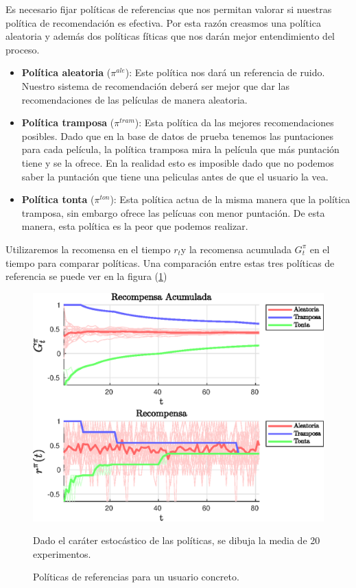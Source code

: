 Es necesario fijar políticas de referencias que nos permitan valorar si nuestras política de recomendación es efectiva. Por esta razón creasmos una política aleatoria y además dos políticas fíticas que nos darán mejor entendimiento del proceso. 
\begin{itemize}
    \item \textbf{Política aleatoria} ($\pi^{ale}$): Este política nos dará un referencia de ruido. Nuestro sistema de recomendación deberá ser mejor que dar las recomendaciones de las películas de manera aleatoria. 
    \item \textbf{Política tramposa} ($\pi^{tram}$): Esta política da las mejores recomendaciones posibles. Dado que en la base de datos de prueba tenemos las puntaciones para cada película, la política tramposa mira la película que más puntación tiene y se la ofrece. En la realidad esto es imposible dado que no podemos saber la puntación que tiene una peliculas antes de que el usuario la vea.
    \item \textbf{Política tonta} ($\pi^{ton}$): Esta política actua de la misma manera que la política tramposa, sin embargo ofrece las pelícuas con menor puntación. De esta manera, esta política es la peor que podemos realizar.

\end{itemize}

Utilizaremos la recomensa en el tiempo $r_t$y la recomensa acumulada $G_t^\pi$ en el tiempo para comparar políticas. Una comparación entre estas tres políticas de referencia se puede ver en la figura (\ref{polref})


\begin{figure}[]
    \centering
    \includegraphics[scale=0.8]{img/policyref.eps}
    \caption{Políticas de referencias para un usuario concreto.}{Dado el caráter estocástico de las políticas, se dibuja la media de 20 experimentos.}
    \label{polref}
\end{figure}

